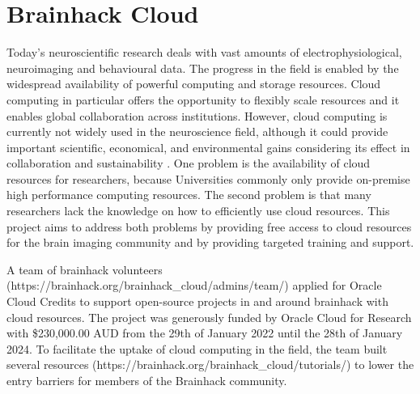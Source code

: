 \documentclass[../main.tex]{subfiles}
\begin{document}
\section{Brainhack Cloud}



Today’s neuroscientific research deals with vast amounts of electrophysiological, neuroimaging and behavioural data. The progress in the field is enabled by the widespread availability of powerful computing and storage resources. Cloud computing in particular offers the opportunity to flexibly scale resources and it enables global collaboration across institutions. However, cloud computing is currently not widely used in the neuroscience field, although it could provide important scientific, economical, and environmental gains considering its effect in collaboration and sustainability \parencite{apon2015, OracleSustainabilty}. One problem is the availability of cloud resources for researchers, because Universities commonly only provide on-premise high performance computing resources. The second problem is that many researchers lack the knowledge on how to efficiently use cloud resources. This project aims to address both problems by providing free access to cloud resources for the brain imaging community and by providing targeted training and support.

A team of brainhack volunteers (https://brainhack.org/brainhack\_cloud/admins/team/) applied for Oracle Cloud Credits to support open-source projects in and around brainhack with cloud resources. The project was generously funded by Oracle Cloud for Research \parencite{OracleResearch} with \$230,000.00 AUD from the 29th of January 2022 until the 28th of January 2024. To facilitate the uptake of cloud computing in the field, the team built several resources (https://brainhack.org/brainhack\_cloud/tutorials/) to lower the entry barriers for members of the Brainhack community. 
\end{document}
